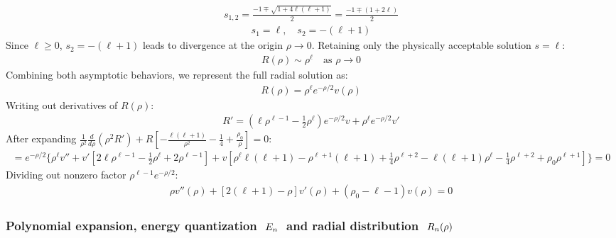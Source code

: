 \documentclass[letterpaper,10pt,english]{jupyterBook}
\begin{document}
\begin{equation*}
\begin{split}s_{1,2} = \frac{-1 \mp \sqrt{1 + 4\ell(\ell + 1)}}{2} = \frac{-1 \mp (1 + 2\ell)}{2}\end{split}
\end{equation*}\begin{equation*}
\begin{split}s_1 = \ell, \quad s_2 = -(\ell + 1)\end{split}
\end{equation*}
\sphinxAtStartPar
Since \(\ell \ge 0\), \(s_2 = -(\ell + 1)\) leads to divergence at the origin \(\rho \to 0\). Retaining only the physically acceptable solution \(s = \ell\):
\begin{equation*}
\begin{split}R(\rho) \sim \rho^\ell \quad \text{as } \rho \to 0\end{split}
\end{equation*}
\sphinxAtStartPar
{} Combining both asymptotic behaviors, we represent the full radial solution as:
\begin{equation*}
\begin{split}R(\rho) = \rho^\ell e^{-\rho/2} v(\rho)\end{split}
\end{equation*}
\sphinxAtStartPar
Writing out derivatives of \(R(\rho)\):
\begin{equation*}
\begin{split}R' = \left( \ell \rho^{\ell-1} - \frac{1}{2} \rho^\ell \right) e^{-\rho/2} v + \rho^\ell e^{-\rho/2} v'\end{split}
\end{equation*}
\sphinxAtStartPar
After expanding \(\frac{1}{\rho^2} \frac{d}{d\rho} \left( \rho^2 R' \right) + R \left[ - \frac{\ell(\ell + 1)}{\rho^2} - \frac{1}{4} + \frac{\rho_0}{\rho} \right] = 0\):
\begin{equation*}
\begin{split}= e^{-\rho/2} \Big\{ \rho^\ell v'' + v' \left[ 2\ell \rho^{\ell-1} - \frac{1}{2} \rho^\ell + 2 \rho^{\ell-1} \right] + v \left[ \rho^\ell \ell(\ell+1) - \rho^{\ell+1} \left( \ell + 1 \right) + \frac{1}{4} \rho^{\ell+2} - \ell(\ell+1) \rho^{\ell} - \frac{1}{4} \rho^{\ell+2} + \rho_0 \rho^{\ell+1} \right] \Big\} = 0\end{split}
\end{equation*}
\sphinxAtStartPar
Dividing out non\sphinxhyphen{}zero factor \(\rho^{\ell-1} e^{-\rho/2}\):
\begin{equation*}
\begin{split}\rho v''(\rho) + [2(\ell + 1) - \rho] v'(\rho) + (\rho_0 - \ell - 1) v(\rho) = 0\end{split}
\end{equation*}\subsubsection*{Polynomial expansion, energy quantization \protect\(\ E_n \ \protect\) and radial distribution \protect\(\ R_n(\rho)\protect\)}
\end{document}
